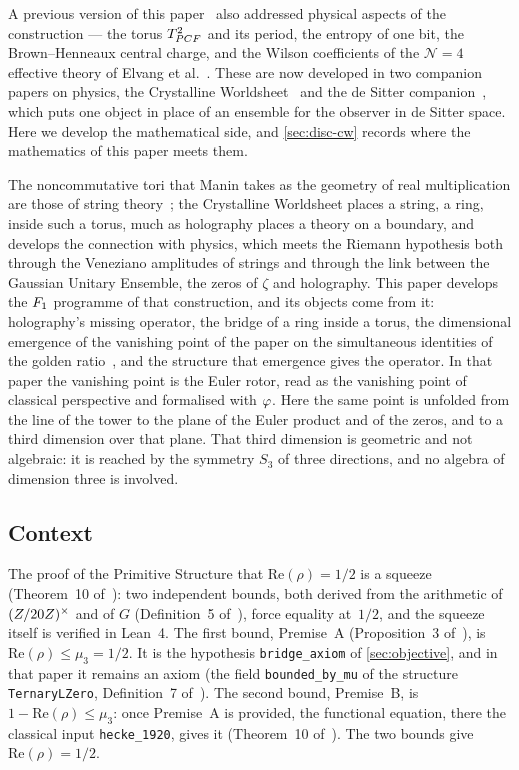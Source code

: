 A previous version of this paper~\cite{gonzalez26oddzeta} also addressed physical aspects of the
construction --- the torus $T^2_{PCF}$ and its period, the entropy of one bit, the Brown--Henneaux
central charge, and the Wilson coefficients of the $\mathcal{N}{=}4$ effective theory of Elvang
et al.~\cite{elvang26}.  These are now developed in two companion papers on physics, the Crystalline
Worldsheet~\cite{gonzalez26cw} and the de Sitter companion~\cite{gonzalez26ds}, which puts one object in place of an
ensemble for the observer in de Sitter space.  Here we develop the mathematical side, and \cref{sec:disc-cw}
records where the mathematics of this paper meets them.

The noncommutative tori that Manin takes as the geometry of real
multiplication are those of string theory~\cite{manin04,connes98}; the Crystalline Worldsheet places a
string, a ring, inside such a torus, much as holography places a theory on a boundary, and develops the
connection with physics, which meets the Riemann hypothesis both through the Veneziano amplitudes of
strings and through the link between the Gaussian Unitary Ensemble, the zeros of $\zeta$ and holography.
This paper develops the $F_1$ programme of that construction, and its objects come from it: holography's
missing operator, the bridge of a ring inside a torus, the dimensional emergence of the vanishing point of the
paper on the simultaneous identities of the golden ratio~\cite{gonzalez26mersenne}, and the structure that
emergence gives the operator.  In that paper the vanishing point is the Euler rotor, read as the vanishing point of
classical perspective and formalised with $\varphi$.  Here the same point is unfolded from the line of the tower to
the plane of the Euler product and of the zeros, and to a third dimension over that plane.  That third dimension is
geometric and not algebraic: it is reached by the symmetry $S_3$ of three directions, and no algebra of dimension
three is involved.

\subsection{Context}\label{sec:context}\label{ssec:intro-circ}

The proof of the Primitive Structure that $\mathrm{Re}(\rho)=1/2$ is a squeeze (Theorem~10
of~\cite{gonzalez25hp}): two independent bounds, both derived from the arithmetic of $(Z/20Z)^\times$ and of
$G$ (Definition~5 of~\cite{gonzalez25hp}), force equality at~$1/2$, and the squeeze itself is verified
in Lean~4.  The first bound, Premise~A (Proposition~3 of~\cite{gonzalez25hp}), is
$\mathrm{Re}(\rho)\le\mu_3=1/2$.  It is the hypothesis \texttt{bridge\_axiom} of \cref{sec:objective}, and in
that paper it remains an axiom (the field \texttt{bounded\_by\_mu} of the structure \texttt{TernaryLZero},
Definition~7 of~\cite{gonzalez25hp}).  The second bound, Premise~B, is $1-\mathrm{Re}(\rho)\le\mu_3$: once
Premise~A is provided, the functional equation, there the classical input \texttt{hecke\_1920}, gives it
(Theorem~10 of~\cite{gonzalez25hp}).  The two bounds give $\mathrm{Re}(\rho)=1/2$.

